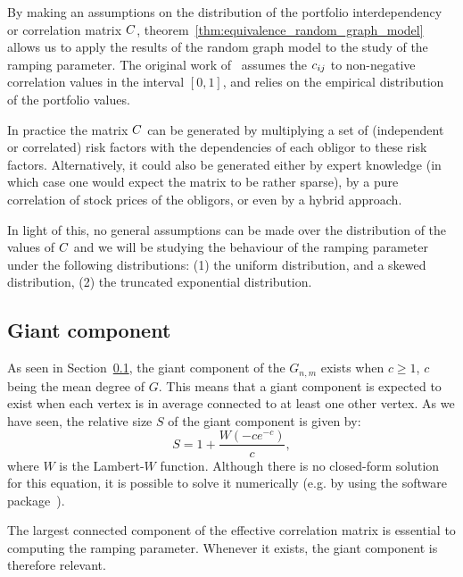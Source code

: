 \vspace{0.5cm}

By making an assumptions on the distribution of the portfolio interdependency or correlation matrix $C$, theorem~\vref{thm:equivalence_random_graph_model} allows us to apply the results of the random graph model to the study of the ramping parameter.
The original work of~\cite{Sindel:2009vd} assumes the $c_{ij}$ to non-negative correlation values in the interval $[0,1]$, and relies on the empirical distribution of the portfolio values.

In practice the matrix $C$ can be generated by multiplying a set of (independent or correlated) risk factors with the dependencies of each obligor to these risk factors.
Alternatively, it could also be generated either by expert knowledge (in which case one would expect the matrix to be rather sparse), by a pure correlation of stock prices of the obligors, or even by a hybrid approach.

In light of this, no general assumptions can be made over the distribution of the values of $C$ and we will be studying the behaviour of the ramping parameter under the following distributions:
(1) the uniform distribution, and a skewed distribution, (2) the truncated exponential distribution.

\subsection{Giant component} %
\label{sub:giant_component}

As seen in Section~\ref{sub:giant_component}, the giant component of the $G_{n,m}$ exists when $c \ge 1$, $c$ being the mean degree of $G$.
This means that a giant component is expected to exist when each vertex is in average connected to at least one other vertex.
As we have seen, the relative size $S$ of the giant component is given by:
\begin{equation}
	S = 1 + \frac{W(-c e^{-c})}{c},
\end{equation}
\noindent where $W$ is the Lambert-$W$ function.
Although there is no closed-form solution for this equation, it is possible to solve it numerically (e.g. by using the software package~\cite{sympy}).

The largest connected component of the effective correlation matrix is essential to computing the ramping parameter.
Whenever it exists, the giant component is therefore relevant.

